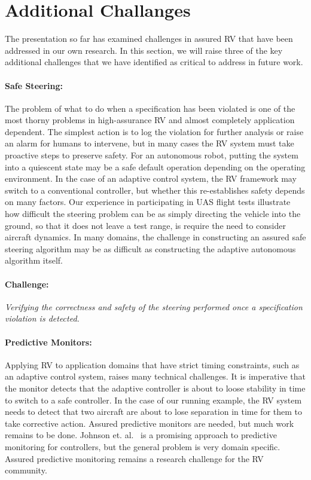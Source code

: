\section{Additional Challanges }\label{sec:future} 
The presentation so far has examined challenges in assured RV that
have been addressed in our own research. In this section, we will
raise three of the key additional challenges that we have identified
as critical to address in future work.

\paragraph{Safe Steering:} The problem of what to do when a
specification has been violated is one of the most thorny problems in
high-assurance RV and almost completely application dependent. The
simplest action is to log the violation for further analysis or raise
an alarm for humans to intervene, but in many cases the RV system must
take proactive steps to preserve safety. For an autonomous robot,
putting the system into a quiescent state may be a safe default
operation depending on the operating environment.  In the case of an
adaptive control system, the RV framework may switch to a conventional
controller, but whether this re-establishes safety depends on many
factors.  Our experience in participating in UAS flight tests
illustrate how difficult the steering problem can be as simply directing
the vehicle into the ground, so that it does not leave a test range,
is  require the need to consider
aircraft dynamics.  In many domains, the challenge in constructing an
assured safe steering algorithm may be as difficult as constructing
the adaptive autonomous algorithm itself.

\paragraph{Challenge:}  \emph{Verifying the correctness and safety of the
steering performed once a specification violation is detected.}
 


\paragraph{Predictive Monitors:} Applying RV to application domains  that have strict timing constraints,
such as an adaptive control system,
raises many technical challenges.  It is imperative that the  monitor  detects that the
adaptive controller is about to loose stability in time to switch to a
safe controller. In the case of our running example, the RV system
needs to detect that two aircraft are about to lose separation in time
for them to take corrective action.  Assured predictive monitors are
needed, but much work remains to be done.  Johnson
et. al.~\cite{johnson2015tecs} is a promising approach to predictive
monitoring for controllers, but the general problem is very domain specific. Assured predictive
monitoring remains a research challenge for the RV community.

